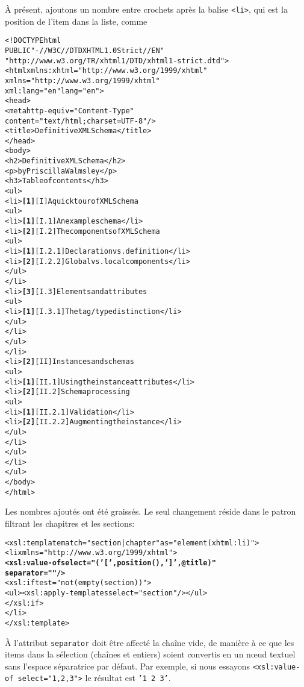 À présent, ajoutons un nombre entre crochets après la balise \XHTML
\texttt{<li>}, qui est la position de l'item dans la liste, comme
\begin{alltt}
\small<!DOCTYPE html
  PUBLIC "-//W3C//DTD XHTML 1.0 Strict//EN"
         "http://www.w3.org/TR/xhtml1/DTD/xhtml1-strict.dtd">
<html xmlns:xhtml="http://www.w3.org/1999/xhtml"
      xmlns="http://www.w3.org/1999/xhtml"
      xml:lang="en" lang="en">
  <head>
    <meta http-equiv="Content-Type"
          content="text/html; charset=UTF-8"/>
    <title>Definitive XML Schema</title>
  </head>
  <body>
    <h2>Definitive XML Schema</h2>
    <p>by Priscilla Walmsley</p>
    <h3>Table of contents</h3>
    <ul>
      <li>\textbf{[1]} [I] A quick tour of XML Schema
        <ul>
          <li>\textbf{[1]} [I.1] An example schema</li>
          <li>\textbf{[2]} [I.2] The components of XML Schema
            <ul>
              <li>\textbf{[1]} [I.2.1] Declaration vs. definition</li>
              <li>\textbf{[2]} [I.2.2] Global vs. local components</li>
            </ul>
          </li>
          <li>\textbf{[3]} [I.3] Elements and attributes
            <ul>
              <li>\textbf{[1]} [I.3.1] The tag/type distinction</li>
            </ul>
          </li>
        </ul>
      </li>
      <li>\textbf{[2]} [II] Instances and schemas
        <ul>
          <li>\textbf{[1]} [II.1] Using the instance attributes</li>
          <li>\textbf{[2]} [II.2] Schema processing
            <ul>
              <li>\textbf{[1]} [II.2.1] Validation</li>
              <li>\textbf{[2]} [II.2.2] Augmenting the instance</li>
            </ul>
          </li>
        </ul>
      </li>
    </ul>
  </body>
</html>
\end{alltt}
Les nombres ajoutés ont été graissés. Le seul changement réside dans
le patron filtrant les chapitres et les sections:
\begin{alltt}
\small <xsl:template match="section|chapter" as="element(xhtml:li)">
    <li xmlns="http://www.w3.org/1999/xhtml">
      \textbf{<xsl:value-of select="('[',position(),'] ',@title)"
                    separator=""/>}
      <xsl:if test="not(empty(section))">
        <ul><xsl:apply-templates select="section"/></ul>
      </xsl:if>
    </li>
  </xsl:template>
\end{alltt}
À l'attribut \texttt{separator} doit être affecté la chaîne vide, de
manière à ce que les items dans la sélection (chaînes et entiers)
soient convertis en un nœud textuel sans l'espace séparatrice par
défaut. Par exemple, si nous essayons \texttt{<xsl:value-of
  select="1,2,3">} le résultat est \texttt{'1 2 3'}.

